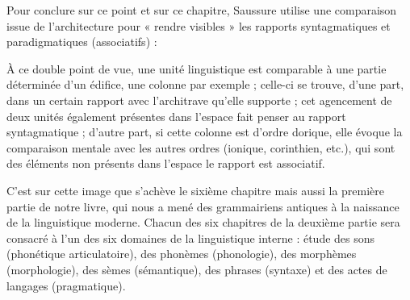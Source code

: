Pour conclure sur ce point et sur ce chapitre, Saussure utilise une comparaison issue de l’architecture pour « rendre visibles » les rapports syntagmatiques et paradigmatiques (associatifs) :
\begin{lecture}{}
À ce double point de vue, une unité linguistique est comparable à une partie déterminée d’un édifice, une colonne par exemple ; celle-ci se trouve, d’une part, dans un certain rapport avec l’architrave qu’elle supporte ; cet agencement de deux unités également présentes dans l’espace fait penser au rapport syntagmatique ; d’autre part, si cette colonne est d’ordre dorique, elle évoque la comparaison mentale avec les autres ordres (ionique, corinthien, etc.), qui sont des éléments non présents dans l’espace le rapport est associatif.
\end{lecture}
C’est sur cette image que s’achève le sixième chapitre mais aussi la première partie de notre livre, qui nous a mené des grammairiens antiques à la naissance de la linguistique moderne. Chacun des six chapitres de la deuxième partie sera consacré à l’un des six domaines de la linguistique interne : étude des sons (phonétique articulatoire), des phonèmes (phonologie), des morphèmes (morphologie), des sèmes (sémantique), des phrases (syntaxe) et des actes de langages (pragmatique).

